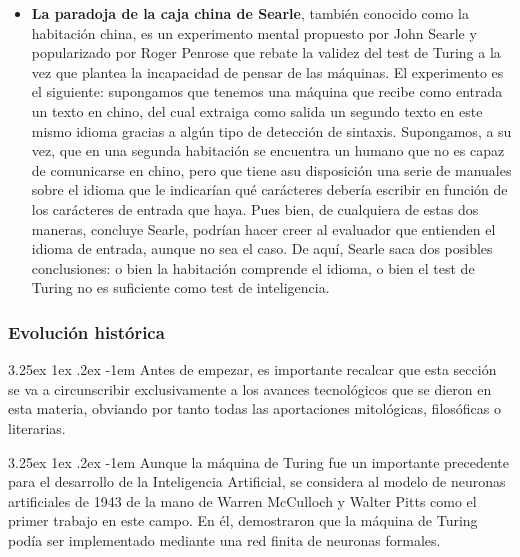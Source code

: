 \documentclass{article}
\makeatletter
\renewcommand\paragraph{\@startsection{paragraph}{5}{\z@}%
  {3.25ex \@plus1ex \@minus.2ex}%
  {-1em}%
  {\normalfont\normalsize\bfseries}}
\makeatother
\begin{document}
\begin{itemize}
    \item \textbf{La paradoja de la caja china de Searle}, también conocido como la habitación china, es un experimento mental propuesto por John Searle y popularizado por Roger Penrose que rebate la validez del test de Turing a la vez que plantea la incapacidad de pensar de las máquinas. El experimento es el siguiente: supongamos que tenemos una máquina que recibe como entrada un texto en chino, del cual extraiga como salida un segundo texto en este mismo idioma gracias a algún tipo de detección de sintaxis. Supongamos, a su vez, que en una segunda habitación se encuentra un humano que no es capaz de comunicarse en chino, pero que tiene asu disposición una serie de manuales sobre el idioma que le indicarían qué carácteres debería escribir en función de los carácteres de entrada que haya. Pues bien, de cualquiera de estas dos maneras, concluye Searle, podrían hacer creer al evaluador que entienden el idioma de entrada, aunque no sea el caso. De aquí, Searle saca dos posibles conclusiones: o bien la habitación comprende el idioma, o bien el test de Turing no es suficiente como test de inteligencia.
    
\end{itemize}

        \subsubsection{Evolución histórica}

\paragraph{}
Antes de empezar, es importante recalcar que esta sección se va a circunscribir exclusivamente a los avances tecnológicos que se dieron en esta materia, obviando por tanto todas las aportaciones mitológicas\cite{automatasHefeso}, filosóficas \cite{filosofiaIA}o literarias\cite{frankenstein}\cite{yoRobot}.

\paragraph{}
Aunque la máquina de Turing\cite{maquinaTuring} fue un importante precedente para el desarrollo de la Inteligencia Artificial, se considera al modelo de neuronas artificiales de 1943 de la mano de Warren McCulloch y Walter Pitts\cite{mcculloch1943} como el primer trabajo en este campo. En él, demostraron que la máquina de Turing podía ser implementado mediante una red finita de neuronas formales.
\end{document}
